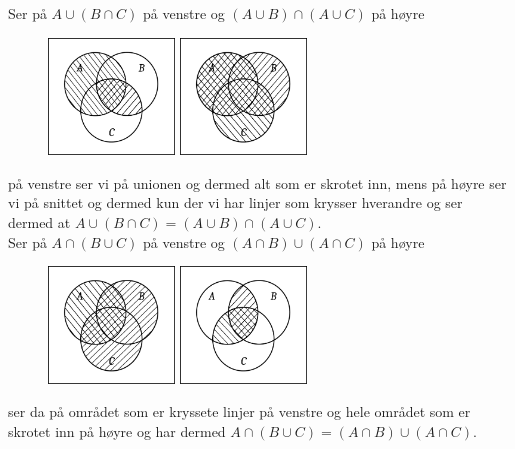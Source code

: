\documentclass{report}
\begin{document}
Ser på $A\cup (B\cap C)$ på venstre og $(A\cup B) \cap (A\cup C)$ på høyre
\begin{figure}[H]
  \centering
  \includegraphics[width=0.3\textwidth]{pics/six.pdf} \;\;\;
  \includegraphics[width=0.3\textwidth]{pics/seven.pdf}
\end{figure}
på venstre ser vi på unionen og dermed alt som er skrotet inn, mens på høyre ser vi på snittet og dermed kun der vi har linjer som krysser hverandre og ser dermed at $A\cup (B\cap C) = (A\cup B) \cap (A\cup C)$. \\

Ser på $A\cap (B\cup C)$ på venstre og $(A\cap B) \cup (A\cap C)$ på høyre
\begin{figure}[H]
  \centering
  \includegraphics[width=0.3\textwidth]{pics/eight.pdf} \;\;\;
  \includegraphics[width=0.3\textwidth]{pics/nine.pdf}
\end{figure}
ser da på området som er kryssete linjer på venstre og hele området som er skrotet inn på høyre og har dermed $A\cap (B\cup C) = (A\cap B) \cup (A\cap C)$.
\end{document}
